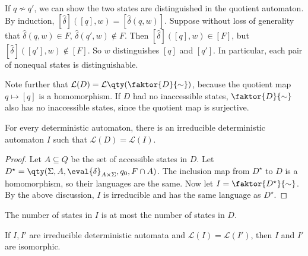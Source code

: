 If \( q \not\sim q' \), we can show the two states are distinguished in the quotient automaton.
By induction, \( [\hat\delta]([q],w) = [\hat\delta(q,w)] \).
Suppose without loss of generality that \( \hat\delta(q,w) \in F \), \( \hat\delta(q',w) \not\in F \).
Then \( [\hat\delta]([q],w) \in [F] \), but \( [\hat\delta]([q'],w) \not\in [F] \).
So \( w \) distinguishes \( [q] \) and \( [q'] \).
In particular, each pair of nonequal states is distinguishable.

Note further that \( \mathcal L(D) = \mathcal L\qty(\faktor{D}{\sim}) \), because the quotient map \( q \mapsto [q] \) is a homomorphism.
If \( D \) had no inaccessible states, \( \faktor{D}{\sim} \) also has no inaccessible states, since the quotient map is surjective.
\begin{theorem}
	For every deterministic automaton, there is an irreducible deterministic automaton \( I \) such that \( \mathcal L(D) = \mathcal L(I) \).
\end{theorem}
\begin{proof}
	Let \( A \subseteq Q \) be the set of accessible states in \( D \).
	Let \( D^\star = \qty(\Sigma, A, \eval{\delta}_{A \times \Sigma}, q_0, F \cap A) \).
	The inclusion map from \( D^\star \) to \( D \) is a homomorphism, so their languages are the same.
	Now let \( I = \faktor{D^\star}{\sim} \).
	By the above discussion, \( I \) is irreducible and has the same language as \( D^\star \).
\end{proof}
\begin{remark}
	The number of states in \( I \) is at most the number of states in \( D \).
\end{remark}
\begin{theorem}
	If \( I, I' \) are irreducible deterministic automata and \( \mathcal L(I) = \mathcal L(I') \), then \( I \) and \( I' \) are isomorphic.
\end{theorem}
